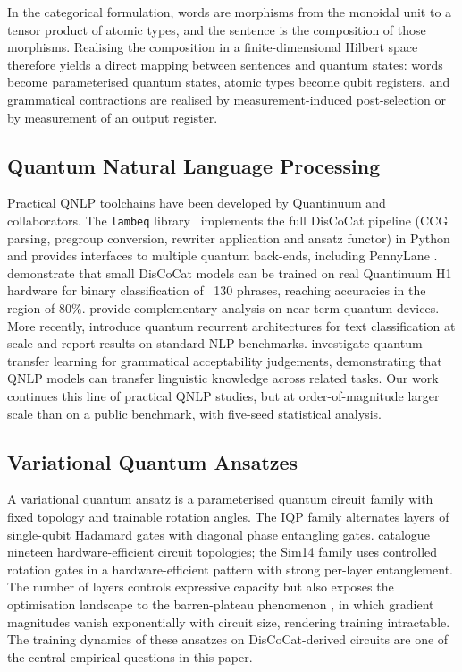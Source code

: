 \documentclass[11pt, a4paper]{article}
\begin{document}
In the categorical formulation, words are morphisms from the
monoidal unit to a tensor product of atomic types, and the sentence is
the composition of those morphisms. Realising the composition in a
finite-dimensional Hilbert space therefore yields a direct mapping
between sentences and quantum states: words become parameterised
quantum states, atomic types become qubit registers, and grammatical
contractions are realised by measurement-induced post-selection or by
measurement of an output register.

\subsection{Quantum Natural Language Processing}

Practical QNLP toolchains have been developed by Quantinuum and
collaborators. The \texttt{lambeq} library~\citep{kartsaklis2021}
implements the full DisCoCat pipeline (CCG parsing, pregroup
conversion, rewriter application and ansatz functor) in Python and
provides interfaces to multiple quantum back-ends, including
PennyLane \citep{bergholm2018}.
\citet{lorenz2021} demonstrate that small DisCoCat models can be
trained on real Quantinuum H1 hardware for binary classification of
~130 phrases, reaching accuracies in the region of \(80\%\).
\citet{meichanetzidis2020} provide complementary analysis on
near-term quantum devices. More recently, \citet{xu2024} introduce
quantum recurrent architectures for text classification at scale and
report results on standard NLP benchmarks. \citet{buonaiuto2024}
investigate quantum transfer learning for grammatical acceptability
judgements, demonstrating that QNLP models can transfer linguistic
knowledge across related tasks. Our work continues this line of
practical QNLP studies, but at order-of-magnitude larger scale than
\citet{lorenz2021} on a public benchmark, with five-seed statistical
analysis.

\subsection{Variational Quantum Ansatzes}

A variational quantum ansatz is a parameterised quantum circuit family
with fixed topology and trainable rotation angles. The IQP family
\citep{havlicek2019} alternates layers of single-qubit Hadamard gates
with diagonal phase entangling gates. \citet{sim2019} catalogue nineteen hardware-efficient circuit
topologies; the Sim14 family uses controlled rotation gates in a
hardware-efficient pattern with strong per-layer entanglement. The number of layers
controls expressive capacity but also exposes the optimisation
landscape to the barren-plateau phenomenon
\citep{mcclean2018, cerezo2021}, in which gradient magnitudes vanish
exponentially with circuit size, rendering training intractable. The
training dynamics of these ansatzes on DisCoCat-derived circuits are
one of the central empirical questions in this paper.
\end{document}
